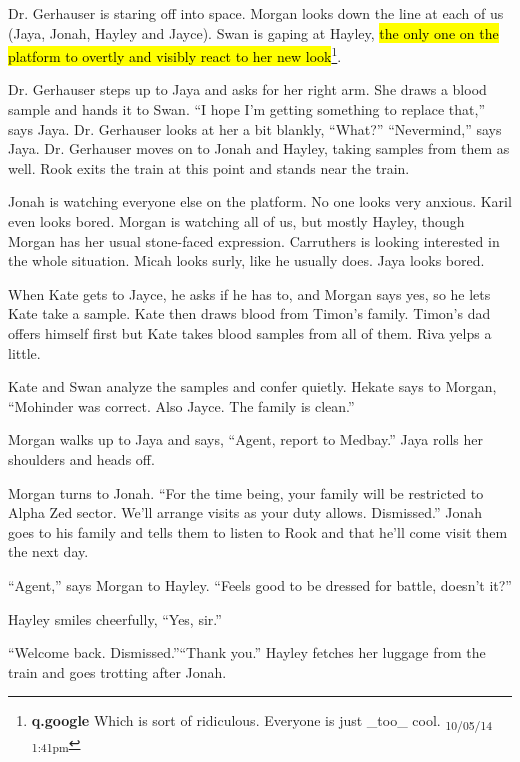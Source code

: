 Dr. Gerhauser is staring off into space.  Morgan looks down the line at each of us (Jaya, Jonah, Hayley and Jayce).  Swan is gaping at Hayley, \hl{the only one on the platform to overtly and visibly react to her new look}\footnote{\textbf{q.google }Which is sort of ridiculous.  Everyone is just \_too\_ cool. \textsubscript{10/05/14 1:41pm}}.  



Dr. Gerhauser steps up to Jaya and asks for her right arm.  She draws a blood sample and hands it to Swan.  ``I hope I'm getting something to replace that,'' says Jaya.  Dr. Gerhauser looks at her a bit blankly, ``What?''  ``Nevermind,'' says Jaya.  Dr. Gerhauser moves on to Jonah and Hayley, taking samples from them as well.  Rook exits the train at this point and stands near the train.  



Jonah is watching everyone else on the platform.  No one looks very anxious.  Karil even looks bored.  Morgan is watching all of us, but mostly Hayley, though Morgan has her usual stone-faced expression.  Carruthers is looking interested in the whole situation.  Micah looks surly, like he usually does.  Jaya looks bored.  



When Kate gets to Jayce, he asks if he has to, and Morgan says yes, so he lets Kate take a sample.  Kate then draws blood from Timon's family.  Timon's dad offers himself first but Kate takes blood samples from all of them.  Riva yelps a little.



Kate and Swan analyze the samples and confer quietly.  Hekate says to Morgan, ``Mohinder was correct. Also Jayce. The family is clean.''  



Morgan walks up to Jaya and says, ``Agent, report to Medbay.''  Jaya rolls her shoulders and heads off.

Morgan turns to Jonah. ``For the time being, your family will be restricted to Alpha Zed sector.  We'll arrange visits as your duty allows.  Dismissed.''  Jonah goes to his family and tells them to listen to Rook and that he'll come visit them the next day.

``Agent,'' says Morgan to Hayley. ``Feels good to be dressed for battle, doesn't it?''

Hayley smiles cheerfully, ``Yes, sir.''

``Welcome back.  Dismissed.''``Thank you.''  Hayley fetches her luggage from the train and goes trotting after Jonah.


